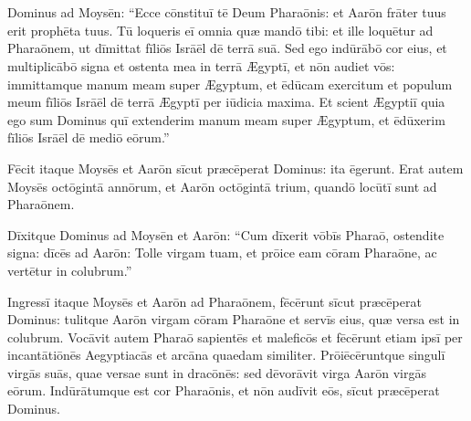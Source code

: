 \chapter{}


\thispagestyle{empty}

 Dominus ad Moysēn: ``Ecce cōnstituī tē Deum
Pharaōnis: et Aarōn frāter tuus erit
prophēta tuus. Tū loqueris eī omnia quæ
mandō tibi: et ille loquētur ad Pharaōnem,
ut dīmittat fīliōs Isrāēl dē terrā suā. Sed ego
indūrābō cor eius, et
multiplicābō signa et ostenta mea
in terrā Ægyptī, et nōn audiet vōs: immittamque manum meam super Ægyptum, et ēdūcam exercitum et
populum meum fīliōs Isrāēl dē terrā Ægyptī per
iūdicia maxima. Et scient Ægyptiī quia ego sum Dominus
quī extenderim manum meam super Ægyptum, et ēdūxerim fīliōs
Isrāēl dē mediō eōrum.''

Fēcit itaque
Moysēs et Aarōn sīcut præcēperat
Dominus: ita ēgerunt. Erat autem Moysēs octōgintā
annōrum, et Aarōn octōgintā trium, quandō locūtī sunt ad
Pharaōnem.

Dīxitque Dominus ad Moysēn et
Aarōn: ``Cum dīxerit vōbīs Pharaō, ostendite signa: dīcēs
ad Aarōn: Tolle virgam tuam, et prōice eam cōram
Pharaōne, ac vertētur in colubrum.''

Ingressī itaque Moysēs et Aarōn ad Pharaōnem, fēcērunt sīcut
præcēperat Dominus: tulitque Aarōn virgam cōram
Pharaōne et servīs eius, quæ versa est in
colubrum. Vocāvit autem Pharaō sapientēs
et maleficōs et fēcērunt etiam ipsī per
incantātiōnēs Aegyptiacās et
arcāna quaedam similiter. Prōiēcēruntque
singulī virgās suās, quae versae sunt in dracōnēs: sed
dēvorāvit virga Aarōn virgās eōrum.  Indūrātumque est cor Pharaōnis, et nōn audīvit eōs,
sīcut præcēperat Dominus.

